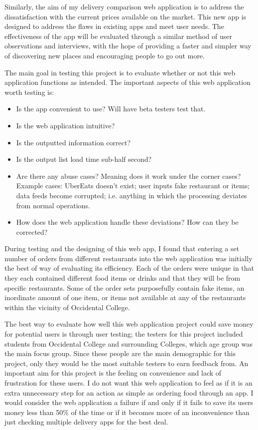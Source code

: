 \documentclass[10pt,twocolumn]{article}
\begin{document}
Similarly, the aim of my delivery comparison web application is to address the dissatisfaction with the current prices available on the market. This new app is designed to address the flaws in existing apps and meet user needs. The effectiveness of the app will be evaluated through a similar method of user observations and interviews, with the hope of providing a faster and simpler way of discovering new places and encouraging people to go out more.

The main goal in testing this project is to evaluate whether or not this web application functions as intended. The important aspects of this web application worth testing is:

\begin{itemize}
    \item Is the app convenient to use? Will have beta testers test that.
    \item Is the web application intuitive?
    \item Is the outputted information correct?
    \item Is the output list load time sub-half second?
    \item Are there any abuse cases? Meaning does it work under the corner cases? 
    \subitem Example cases: UberEats doesn't exist; user inputs fake restaurant or items; data feeds become corrupted; i.e. anything in which the processing deviates from normal operations.
    \item How does the web application handle these deviations? How can they be corrected?
\end{itemize}

During testing and the designing of this web app, I found that entering a set number of orders from different restaurants into the web application was initially the best of way of evaluating its efficiency. Each of the orders were unique in that they each contained different food items or drinks and that they will be from specific restaurants. Some of the order sets purposefully contain fake items, an inordinate amount of one item, or items not available at any of the restaurants within the vicinity of Occidental College.

The best way to evaluate how well this web application project could save money for potential users is through user testing; the testers for this project included students from Occidental College and surrounding Colleges, which age group was the main focus group. Since these people are the main demographic for this project, only they would be the most suitable testers to earn feedback from. An important aim for this project is the feeling on convenience and lack of frustration for these users. I do not want this web application to feel as if it is an extra unnecessary step for an action as simple as ordering food through an app. I would consider the web application a failure if and only if it fails to save its users money less than 50\% of the time or if it becomes more of an inconvenience than just checking multiple delivery apps for the best deal.
\end{document}
